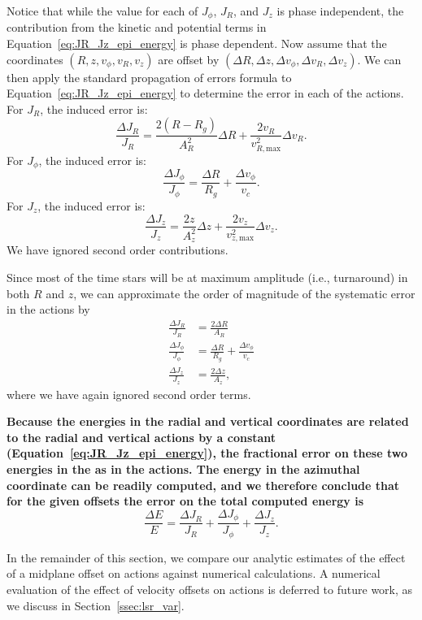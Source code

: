 \documentclass[twocolumn]{aastex62}
\newcommand{\beq}{\begin{equation}}
\newcommand{\eeq}{\end{equation}}
\begin{document}
Notice that while the value for each of $J_{\phi}$, $J_R$, and $J_z$ is phase
independent, the contribution from the kinetic and potential terms in
Equation~\eqref{eq:JR_Jz_epi_energy} is phase dependent. Now assume that the
coordinates $(R, z, v_{\phi}, v_R, v_z)$ are offset by $(\Delta R, \Delta z,
\Delta v_{\phi}, \Delta v_R, \Delta v_z)$. We can then apply the standard
propagation of errors formula to Equation~\eqref{eq:JR_Jz_epi_energy} to
determine the error in each of the actions. 
For $J_R$, the induced error is:
\beq\label{eq:induced_JR}
\frac{\Delta J_R}{J_R} = \frac{2(R-R_g)}{A_R^2}\Delta R
                         + \frac{2v_R}{v_{R,\text{max}}^2} \Delta v_R \text{.}
\eeq
For $J_{\phi}$, the induced error
is:
\beq\label{eq:induced_Jphi}
\frac{\Delta J_{\phi}}{J_{\phi}} = \frac{\Delta R}{R_g}
                                    + \frac{\Delta v_{\phi}}{v_c}\text{.}
\eeq
For $J_z$, the induced error is:
\beq\label{eq:induced_Jz}
\frac{\Delta J_z}{J_z} = \frac{2z}{A_z^2}\Delta z
                         + \frac{2v_z}{v_{z,\text{max}}^2} \Delta v_z \text{.}
\eeq
We have ignored second order contributions.

Since most of the time stars will be at maximum amplitude (i.e., turnaround)
in both $R$ and $z$, we can approximate the order of magnitude of the
systematic error in the actions by
\beq\label{eq:Ji_err_mosttime}
\begin{split}
\frac{\Delta J_{R}}{J_{R}} &= \frac{2\Delta R}{A_R} \\
\frac{\Delta J_{\phi}}{J_{\phi}} &= \frac{\Delta R}{R_g}
                                    + \frac{\Delta v_{\phi}}{v_c} \\
\frac{\Delta J_{z}}{J_{z}} &= \frac{2\Delta z}{A_z} \text{,}
\end{split}
\eeq
where we have again ignored second order terms.

\textbf{Because the energies in the radial and vertical coordinates are related to the
radial and vertical actions by a constant
(Equation~\eqref{eq:JR_Jz_epi_energy}), the fractional error on these two
energies in the as in the actions. The energy in the azimuthal coordinate can
be readily computed, and we therefore conclude that for the given offsets the
error on the total computed energy is
\beq\label{eq:error_total_energy}
\frac{\Delta E}{E} = \frac{\Delta J_R}{J_R} + \frac{\Delta J_{\phi}}{J_{\phi}}
                     + \frac{\Delta J_z}{J_z}\text{.}
\eeq}

In the remainder of this section, we compare our analytic estimates of the
effect of a midplane offset on actions against numerical calculations. A
numerical evaluation of the effect of velocity offsets on actions is deferred
to future work, as we discuss in Section~\ref{ssec:lsr_var}.
\end{document}
